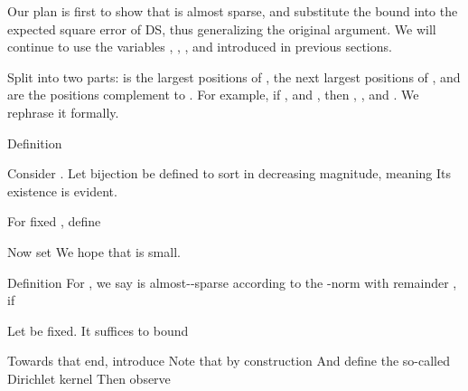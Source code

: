\startsection [title={Almost-Sparsity of Angular Channel Response}]
\startsubsection [title={Norm of Array Response}]

Our plan is first to show that  is almost sparse, and substitute the bound into the expected square error of DS, thus generalizing the original argument.
We will continue to use the variables , , , and  introduced in previous sections.

Split  into two parts:  is the largest  positions of ,  the next  largest positions of , and  are the positions complement to .
For example, if , and , then , , and .
We rephrase it formally.

\Result
{Definition}
{
Consider .
Let bijection  be defined to sort  in decreasing magnitude, meaning
Its existence is evident.

For fixed , define
}

Now set
We hope that  is small.

\Result
{Definition}
{
For , we say  is almost--sparse according to the -norm with remainder , if
}

Let \m {\f} be fixed.
It suffices to bound

Towards that end, introduce
Note that by construction
And define the so-called Dirichlet kernel
Then observe

